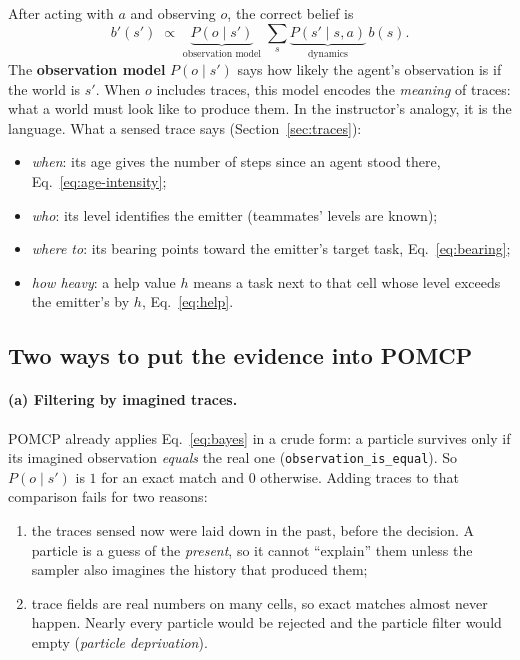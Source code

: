 \documentclass[11pt,a4paper]{article}
\newcommand{\code}[1]{\texttt{#1}}
\theoremstyle{remark}
\begin{document}
After acting with $a$ and observing $o$, the correct belief is
\begin{equation}
  b'(s') \;\propto\; \underbrace{P(o \mid s')}_{\text{observation model}}\;
                     \sum_{s} \underbrace{P(s' \mid s, a)}_{\text{dynamics}}\, b(s) .
  \label{eq:bayes}
\end{equation}
The \textbf{observation model} $P(o\mid s')$ says how likely the agent's observation is if the world is $s'$. When $o$
includes traces, this model encodes the \emph{meaning} of traces: what a world must look like to produce them. In the
instructor's analogy, it is the language. What a sensed trace says (Section~\ref{sec:traces}):
\begin{itemize}[nosep]
  \item \emph{when}: its age gives the number of steps since an agent stood there, Eq.~\eqref{eq:age-intensity};
  \item \emph{who}: its level identifies the emitter (teammates' levels are known);
  \item \emph{where to}: its bearing points toward the emitter's target task, Eq.~\eqref{eq:bearing};
  \item \emph{how heavy}: a help value $h$ means a task next to that cell whose level exceeds the emitter's by $h$,
        Eq.~\eqref{eq:help}.
\end{itemize}

\subsection{Two ways to put the evidence into POMCP}

\paragraph{(a) Filtering by imagined traces.} POMCP already applies Eq.~\eqref{eq:bayes} in a crude form: a particle
survives only if its imagined observation \emph{equals} the real one (\code{observation\_is\_equal}). So $P(o\mid s')$ is
$1$ for an exact match and $0$ otherwise. Adding traces to that comparison fails for two reasons:
\begin{enumerate}[nosep]
  \item the traces sensed now were laid down in the past, before the decision. A particle is a guess of the
        \emph{present}, so it cannot ``explain'' them unless the sampler also imagines the history that produced them;
  \item trace fields are real numbers on many cells, so exact matches almost never happen. Nearly every particle would be
        rejected and the particle filter would empty (\emph{particle deprivation}).
\end{enumerate}
\end{document}
